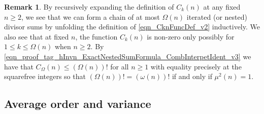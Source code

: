 \documentclass[11pt,reqno,a4letter]{article}
\numberwithin{equation}{section}
\numberwithin{figure}{section}
\numberwithin{table}{section}
\theoremstyle{plain}
\numberwithin{theorem}{section}
\theoremstyle{definition}
\newtheorem{remark}[theorem]{Remark}
\begin{document}
\begin{remark}
By recursively expanding the definition of $C_k(n)$ 
at any fixed $n \geq 2$, we see that 
we can form a chain of at most $\Omega(n)$ iterated (or nested) divisor sums by 
unfolding the definition of \eqref{eqn_CknFuncDef_v2} inductively. 
We also see that at fixed $n$, the function 
$C_k(n)$ is non-zero only possibly for 
$1 \leq k \leq \Omega(n)$ when $n \geq 2$. 
By \eqref{eqn_proof_tag_hInvn_ExactNestedSumFormula_CombInterpetIdent_v3} we have 
that $C_{\Omega}(n) \leq (\Omega(n))!$ for all $n \geq 1$ with 
equality precisely at the squarefree integers so that 
$(\Omega(n))! = (\omega(n))!$ if and only if $\mu^2(n) = 1$. 
\end{remark}

\subsection{Average order and variance}
\label{subSection_AvgOrdersOfTheUnsignedSequences} 
\end{document}
